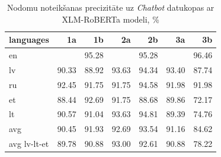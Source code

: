 \begin{table}[htbp]
  \centering
  \caption{Nodomu noteikšanas precizitāte uz \textit{Chatbot} datukopas ar XLM-RoBERTa modeli, \%}
    \begin{tabular}{lrrrrrr} \toprule
    languages & 1a & 1b & 2a & 2b & 3a & 3b \\\midrule
    en    &       & \cellcolor[rgb]{ .514,  .655,  .835}95.28 &       & \cellcolor[rgb]{ .514,  .655,  .835}95.28 &       & \cellcolor[rgb]{ .353,  .541,  .776}96.46 \\
    lv    & \cellcolor[rgb]{ .984,  .945,  .957}90.33 & \cellcolor[rgb]{ .984,  .902,  .914}88.92 & \cellcolor[rgb]{ .737,  .812,  .914}93.63 & \cellcolor[rgb]{ .639,  .745,  .878}94.34 & \cellcolor[rgb]{ .769,  .835,  .925}93.40 & \cellcolor[rgb]{ .984,  .867,  .878}87.74 \\
    ru    & \cellcolor[rgb]{ .894,  .922,  .969}92.45 & \cellcolor[rgb]{ .988,  .988,  1}91.75 & \cellcolor[rgb]{ .988,  .988,  1}91.75 & \cellcolor[rgb]{ .608,  .722,  .867}94.58 & \cellcolor[rgb]{ .957,  .969,  .992}91.98 & \cellcolor[rgb]{ .957,  .969,  .992}91.98 \\
    et    & \cellcolor[rgb]{ .984,  .89,  .902}88.44 & \cellcolor[rgb]{ .863,  .902,  .957}92.69 & \cellcolor[rgb]{ .988,  .988,  1}91.75 & \cellcolor[rgb]{ .984,  .894,  .906}88.68 & \cellcolor[rgb]{ .984,  .929,  .941}89.86 & \cellcolor[rgb]{ .973,  .412,  .42}72.17 \\
    lt    & \cellcolor[rgb]{ .984,  .953,  .965}90.57 & \cellcolor[rgb]{ .984,  .965,  .976}91.04 & \cellcolor[rgb]{ .737,  .812,  .914}93.63 & \cellcolor[rgb]{ .576,  .698,  .855}94.81 & \cellcolor[rgb]{ .984,  .918,  .929}89.39 & \cellcolor[rgb]{ .973,  .486,  .494}74.76 \\\midrule
    avg   & \cellcolor[rgb]{ .984,  .949,  .961}90.45 & \cellcolor[rgb]{ .965,  .973,  .992}91.93 & \cellcolor[rgb]{ .863,  .902,  .957}92.69 & \cellcolor[rgb]{ .749,  .82,  .918}93.54 & \cellcolor[rgb]{ .984,  .969,  .98}91.16 & \cellcolor[rgb]{ .98,  .776,  .788}84.62 \\
    avg lv-lt-et & \cellcolor[rgb]{ .984,  .929,  .941}89.78 & \cellcolor[rgb]{ .984,  .961,  .973}90.88 & \cellcolor[rgb]{ .82,  .871,  .941}93.00 & \cellcolor[rgb]{ .875,  .91,  .961}92.61 & \cellcolor[rgb]{ .984,  .961,  .973}90.88 & \cellcolor[rgb]{ .976,  .588,  .596}78.22 \\\bottomrule
    \end{tabular}%
  \label{tab:chatbot-xlm}%
\end{table}%




